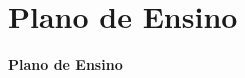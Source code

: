 



\section[Plano de Ensino]{Plano de Ensino}\label{sec:plano-ensino}



{
  \begin{frame}[plain]%

    \vfill

    \centering{}
    \Huge{\textbf{Plano de Ensino}}

    \vfill

\end{frame}
} %



